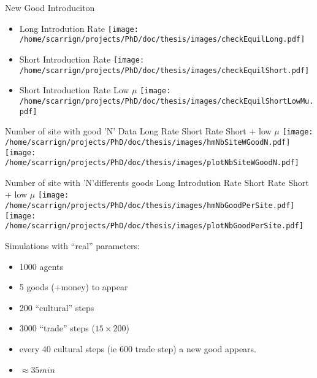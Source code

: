 \documentclass[12pt, notes=show]{beamer}
\begin{document}
\begin{frame}{New Good Introduciton}
    \centering
    \begin{itemize}
	    \small
	\item Long Introdution Rate \texttt{[image: /home/scarrign/projects/PhD/doc/thesis/images/checkEquilLong.pdf]}\\
	\item Short Introduction Rate \texttt{[image: /home/scarrign/projects/PhD/doc/thesis/images/checkEquilShort.pdf]}\\
	\item Short Introduction Rate Low $\mu$  \texttt{[image: /home/scarrign/projects/PhD/doc/thesis/images/checkEquilShortLowMu.pdf]}\\
    \end{itemize}
\end{frame}

\begin{frame}{Number of site with good 'N'}
    \small
Data \hfill Long Rate \hfill Short Rate \hfill Short + low $\mu$ 
	\texttt{[image: /home/scarrign/projects/PhD/doc/thesis/images/hmNbSiteWGoodN.pdf]}\\
	\texttt{[image: /home/scarrign/projects/PhD/doc/thesis/images/plotNbSiteWGoodN.pdf]}\\
\end{frame}

\begin{frame}{Number of site with 'N'differents goods}
    \centering
    \tiny
Long Introdution Rate \hfill Short Rate \hfill Short + low $\mu$ 
	\texttt{[image: /home/scarrign/projects/PhD/doc/thesis/images/hmNbGoodPerSite.pdf]}\\
	\vfil
	\texttt{[image: /home/scarrign/projects/PhD/doc/thesis/images/plotNbGoodPerSite.pdf]}\\
\end{frame}

\begin{frame}
    Simulations with ``real'' parameters:
    \begin{itemize}
	\item 1000 agents
	\item 5 goods (+money) to appear 
	\item 200 ``cultural'' steps 
	\item 3000 ``trade'' steps ($15\times200$)
	\item every 40 cultural steps (ie $600$ trade step) a new good appears.
	\item $\approx 35min$
    \end{itemize}

\end{frame}
\end{document}
